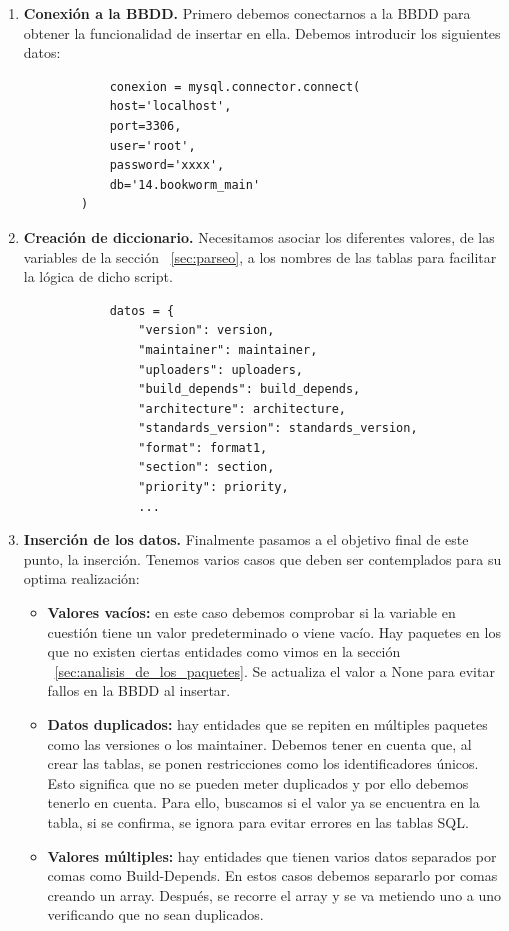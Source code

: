\documentclass[a4paper, 12pt]{book}
\begin{document}
\begin{enumerate}
		\item \textbf{Conexión a la BBDD.} Primero debemos conectarnos a la BBDD para obtener la funcionalidad de insertar en ella. Debemos introducir los siguientes datos:
		\begin{verbatim}
			conexion = mysql.connector.connect(
			host='localhost',
			port=3306,
			user='root',
			password='xxxx',
			db='14.bookworm_main'
		)
		\end{verbatim} 
		
		\item \textbf{Creación de diccionario.} Necesitamos asociar los diferentes valores, de las variables de la sección ~\ref{sec:parseo}, a los nombres de las tablas para facilitar la lógica de dicho script.
		\begin{verbatim}
			datos = {
				"version": version,
				"maintainer": maintainer,
				"uploaders": uploaders,
				"build_depends": build_depends,
				"architecture": architecture,
				"standards_version": standards_version,
				"format": format1,
				"section": section,
				"priority": priority,
				...
		\end{verbatim} 
		
		\item \textbf{Inserción de los datos.} Finalmente pasamos a el objetivo final de este punto, la inserción. Tenemos varios casos que deben ser contemplados para su optima realización:
		
		\begin{itemize}
			\item \textbf{Valores vacíos:} en este caso debemos comprobar si la variable en cuestión tiene un valor predeterminado o viene vacío. Hay paquetes en los que no existen ciertas entidades como vimos en la sección ~\ref{sec:analisis_de_los_paquetes}. Se actualiza el valor a None para evitar fallos en la BBDD al insertar.
			
			\item \textbf{Datos duplicados: } hay entidades que se repiten en múltiples paquetes como las versiones o los maintainer. Debemos tener en cuenta que, al crear las tablas, se ponen restricciones como los identificadores únicos. Esto significa que no se pueden meter duplicados y por ello debemos tenerlo en cuenta. Para ello, buscamos si el valor ya se encuentra en la tabla, si se confirma, se ignora para evitar errores en las tablas SQL.
			
			\item \textbf{Valores múltiples: } hay entidades que tienen varios datos separados por comas como Build-Depends. En estos casos debemos separarlo por comas creando un array. Después, se recorre el array y se va metiendo uno a uno verificando que no sean duplicados.
			

\end{itemize}
\end{enumerate}
\end{document}
